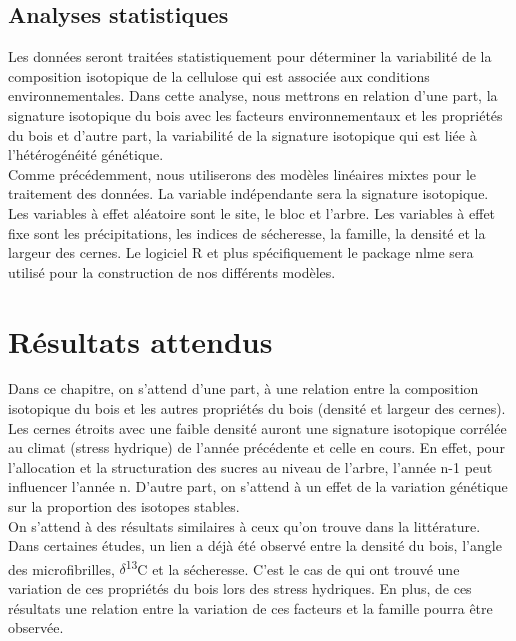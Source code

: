 \documentclass[a4paper,12pt]{report}
\newcommand{\Ctreize}{$\delta$\textsuperscript{13}C\xspace}
\begin{document}
\subsection*{Analyses statistiques}
Les données seront traitées statistiquement pour déterminer la variabilité de la composition isotopique de la cellulose qui est associée aux conditions environnementales. Dans cette analyse, nous mettrons en relation d'une part, la signature isotopique du bois avec les facteurs environnementaux et les propriétés du bois et d'autre part, la variabilité de la signature isotopique qui est liée à l'hétérogénéité génétique. \\

Comme précédemment, nous utiliserons des modèles linéaires mixtes pour le traitement des données. La variable indépendante sera la signature isotopique. Les variables à effet aléatoire sont le site, le bloc et l'arbre. Les variables à effet fixe sont les précipitations, les indices de sécheresse, la famille, la densité et la largeur des cernes. Le logiciel R et plus spécifiquement le package nlme sera utilisé pour la construction de nos différents modèles. 

\section{Résultats attendus}

Dans ce chapitre, on s'attend d'une part, à une relation entre la composition isotopique du bois et les autres propriétés du bois (densité et largeur des cernes). Les cernes étroits avec une faible densité auront une signature isotopique corrélée au climat (stress hydrique) de l'année précédente et celle en cours. En effet, pour l'allocation et la structuration des sucres au niveau de l'arbre, l'année n-1 peut influencer l'année n.  D'autre part, on s'attend à un effet de la variation génétique sur la proportion des isotopes stables.\\

On s'attend à des résultats similaires à ceux qu'on trouve dans la littérature. Dans certaines études, un lien a déjà été observé entre la densité du bois, l'angle des microfibrilles, \Ctreize et la sécheresse. C'est le cas de \cite{Drew2009} qui ont trouvé une variation de ces propriétés du bois lors des stress hydriques. En plus, de ces résultats une relation entre la variation de ces facteurs et la famille pourra être observée.  
\end{document}
